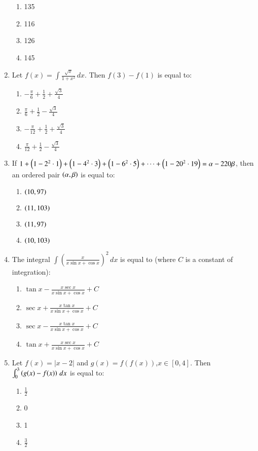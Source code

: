 \documentclass[journal,12pt,twocolumn]{IEEEtran}
\theoremstyle{remark}
\begin{document}
\begin{enumerate}
\begin{enumerate}
    \item 135
    \item 116
    \item 126
    \item 145
\end{enumerate}
\item Let $f(x)=\int\frac{\sqrt{x}}{1+x^2}\,dx$. Then $f(3)-f(1)$ is equal to:
\begin{enumerate}
    \item $-\frac{\pi}{6}+\frac{1}{2}+\frac{\sqrt{3}}{4}$
    \item $\frac{\pi}{6}+\frac{1}{2}-\frac{\sqrt{3}}{4}$
    \item $-\frac{\pi}{12}+\frac{1}{2}+\frac{\sqrt{3}}{4}$
    \item $\frac{\pi}{12}+\frac{1}{2}-\frac{\sqrt{3}}{4}$
\end{enumerate}
\item If $1+\left(1-2^2\cdot1\right)+\left(1-4^2\cdot3\right)+\left(1-6^2\cdot5\right)+\cdots+\left(1-20^2\cdot19\right)=\alpha-220\beta$, then an ordered pair $\left(\alpha,\beta\right)$ is equal to:
\begin{enumerate}
    \item $\left(10, 97\right)$
    \item $\left(11, 103\right)$
    \item $\left(11, 97\right)$
    \item $\left(10,103\right)$
\end{enumerate}
\item The integral $\int\left(\frac{x}{x\sin x+\cos x}\right)^2\,dx$ is equal to (where $C$ is a constant of integration):
\begin{enumerate}
    \item $\tan x-\frac{x\sec x}{x\sin x+\cos x}+C$
    \item $\sec x+\frac{x\tan x}{x\sin x+\cos x}+C$
    \item $\sec x-\frac{x\tan x}{x\sin x+\cos x}+C$
    \item $\tan x+\frac{x\sec x}{x \sin x + \cos x}+C$
\end{enumerate}
\item Let $f(x)=|x-2|$ and $g(x)=f(f(x))$,$x\in [0, 4]$. Then $\int_0^3 \left(g(x)-f(x)\right)\, dx$ is equal to:
\begin{enumerate}
    \item $\frac{1}{2}$
    \item 0
    \item 1
    \item $\frac{3}{2}$

\end{enumerate}
\end{enumerate}
\end{document}
